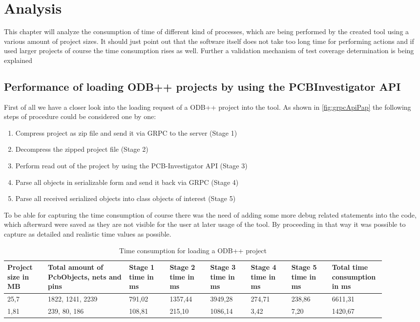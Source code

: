 \chapter{Analysis}
This chapter will analyze the consumption of time of different kind of processes, which are being performed by the created tool using a various amount of project sizes. It should just point out that the software itself does not take too long time for performing actions and if used larger projects of course the time consumption rises as well. Further a validation mechanism of test coverage determination is being explained

	\section{Performance of loading ODB++ projects by using the PCBInvestigator API}
First of all we have a closer look into the loading request of a \ac{ODB}++ project into the tool. As shown in \ref{fig:grpcApiPap} the following steps of procedure could be considered one by one:
\begin{enumerate}
	\item Compress project as zip file and send it via \ac{GRPC} to the server (Stage 1)
	\item Decompress the zipped project file (Stage 2)
	\item Perform read out of the project by using the \ac{PCB}-Investigator \ac{API} (Stage 3)
	\item Parse all objects in serializable form and send it back via \ac{GRPC} (Stage 4)
	\item Parse all received serialized objects into class objects of interest (Stage 5)
\end{enumerate}

To be able for capturing the time consumption of course there was the need of adding some more debug related statements into the code, which afterward were saved as they are not visible for the user at later usage of the tool. By proceeding in that way it was possible to capture as detailed and realistic time values as possible. 

\begin{table}[!h]
    \centering
    \begin{tabular}{p{0.1\linewidth} | p{0.2\linewidth} | p{0.1\linewidth}| p{0.1\linewidth}| p{0.1\linewidth}| p{0.1\linewidth}| p{0.1\linewidth}| p{0.1\linewidth}}
      Project size in MB & Total amount of PcbObjects, nets and pins & Stage 1 time in ms &  Stage 2 time in ms &  Stage 3 time in ms &  Stage 4 time in ms &  Stage 5 time in ms & Total time consumption in ms \\ \hline
      25,7 & 1822, 1241, 2239 & 791,02 & 1357,44 & 3949,28 & 274,71 & 238,86 & 6611,31 \\ \hline
      1,81 & 239, 80, 186 & 108,81 & 215,10 & 1086,14 & 3,42 & 7,20 & 1420,67 \\ 
    \end{tabular}
    \caption{Time consumption for loading a \ac{ODB}++ project}
    \label{tab:timeOdb}
\end{table}

